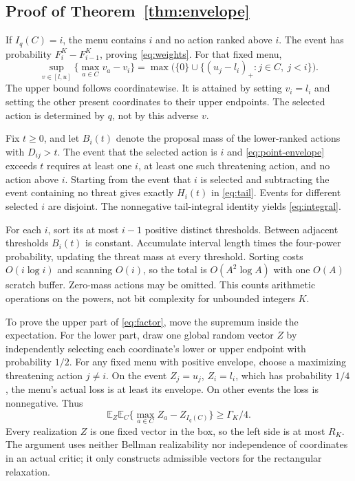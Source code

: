 \documentclass[11pt]{article}
\newcommand{\E}{\mathbb E}\newcommand{\Prb}{\mathbb P}\newcommand{\R}{\mathbb R}
\begin{document}
\subsection{Proof of Theorem~\ref{thm:envelope}}
If $I_q(C)=i$, the menu contains $i$ and no action ranked above $i$. The event has probability $F_i^K-F_{i-1}^K$, proving \eqref{eq:weights}. For that fixed menu,
\begin{equation}
 \sup_{v\in[l,u]}\{\max_{a\in C}v_a-v_i\}
 =\max\bigl(\{0\}\cup\{(u_j-l_i)_+:j\in C,\ j<i\}\bigr).
 \label{eq:point-envelope}
\end{equation}
The upper bound follows coordinatewise. It is attained by setting $v_i=l_i$ and setting the other present coordinates to their upper endpoints. The selected action is determined by $q$, not by this adverse $v$.

Fix $t\ge0$, and let $B_i(t)$ denote the proposal mass of the lower-ranked actions with $D_{ij}>t$. The event that the selected action is $i$ and \eqref{eq:point-envelope} exceeds $t$ requires at least one $i$, at least one such threatening action, and no action above $i$. Starting from the event that $i$ is selected and subtracting the event containing no threat gives exactly $H_i(t)$ in \eqref{eq:tail}. Events for different selected $i$ are disjoint. The nonnegative tail-integral identity yields \eqref{eq:integral}.

For each $i$, sort its at most $i-1$ positive distinct thresholds. Between adjacent thresholds $B_i(t)$ is constant. Accumulate interval length times the four-power probability, updating the threat mass at every threshold. Sorting costs $O(i\log i)$ and scanning $O(i)$, so the total is $O(A^2\log A)$ with one $O(A)$ scratch buffer. Zero-mass actions may be omitted. This counts arithmetic operations on the powers, not bit complexity for unbounded integers $K$.

To prove the upper part of \eqref{eq:factor}, move the supremum inside the expectation. For the lower part, draw one global random vector $Z$ by independently selecting each coordinate's lower or upper endpoint with probability $1/2$. For any fixed menu with positive envelope, choose a maximizing threatening action $j\ne i$. On the event $Z_j=u_j$, $Z_i=l_i$, which has probability $1/4$, the menu's actual loss is at least its envelope. On other events the loss is nonnegative. Thus
\[
 \E_Z\E_C\{\max_{a\in C}Z_a-Z_{I_q(C)}\}\ge\Gamma_K/4.
\]
Every realization $Z$ is one fixed vector in the box, so the left side is at most $R_K$. The argument uses neither Bellman realizability nor independence of coordinates in an actual critic; it only constructs admissible vectors for the rectangular relaxation.
\end{document}
